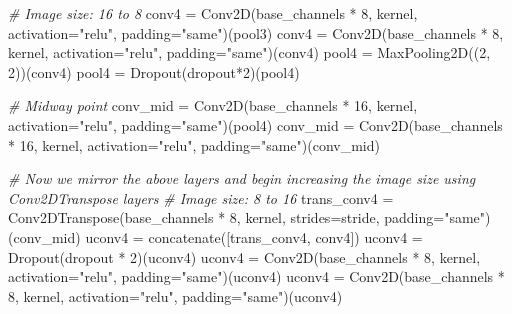 \documentclass[11pt]{article}
\newenvironment{Shaded}{}{}
\newcommand{\DecValTok}[1]{\textcolor[rgb]{0.25,0.63,0.44}{{#1}}}
\newcommand{\StringTok}[1]{\textcolor[rgb]{0.25,0.44,0.63}{{#1}}}
\newcommand{\CommentTok}[1]{\textcolor[rgb]{0.38,0.63,0.69}{\textit{{#1}}}}
\newcommand{\NormalTok}[1]{{#1}}
\newcommand{\OperatorTok}[1]{\textcolor[rgb]{0.40,0.40,0.40}{{#1}}}
\begin{document}
\begin{Shaded}
\begin{Highlighting}[]
    \CommentTok{# Image size: 16 to 8}
\NormalTok{    conv4 }\OperatorTok{=}\NormalTok{ Conv2D(base_channels }\OperatorTok{*} \DecValTok{8}\NormalTok{, kernel, activation}\OperatorTok{=}\StringTok{"relu"}\NormalTok{, padding}\OperatorTok{=}\StringTok{"same"}\NormalTok{)(pool3)}
\NormalTok{    conv4 }\OperatorTok{=}\NormalTok{ Conv2D(base_channels }\OperatorTok{*} \DecValTok{8}\NormalTok{, kernel, activation}\OperatorTok{=}\StringTok{"relu"}\NormalTok{, padding}\OperatorTok{=}\StringTok{"same"}\NormalTok{)(conv4)}
\NormalTok{    pool4 }\OperatorTok{=}\NormalTok{ MaxPooling2D((}\DecValTok{2}\NormalTok{, }\DecValTok{2}\NormalTok{))(conv4)}
\NormalTok{    pool4 }\OperatorTok{=}\NormalTok{ Dropout(dropout}\OperatorTok{*}\DecValTok{2}\NormalTok{)(pool4)}

    \CommentTok{# Midway point}
\NormalTok{    conv_mid }\OperatorTok{=}\NormalTok{ Conv2D(base_channels }\OperatorTok{*} \DecValTok{16}\NormalTok{, kernel, activation}\OperatorTok{=}\StringTok{"relu"}\NormalTok{, padding}\OperatorTok{=}\StringTok{"same"}\NormalTok{)(pool4)}
\NormalTok{    conv_mid }\OperatorTok{=}\NormalTok{ Conv2D(base_channels }\OperatorTok{*} \DecValTok{16}\NormalTok{, kernel, activation}\OperatorTok{=}\StringTok{"relu"}\NormalTok{, padding}\OperatorTok{=}\StringTok{"same"}\NormalTok{)(conv_mid)}

    \CommentTok{# Now we mirror the above layers and begin increasing the image size using Conv2DTranspose layers}
    \CommentTok{# Image size: 8 to 16}
\NormalTok{    trans_conv4 }\OperatorTok{=}\NormalTok{ Conv2DTranspose(base_channels }\OperatorTok{*} \DecValTok{8}\NormalTok{, kernel, strides}\OperatorTok{=}\NormalTok{stride, padding}\OperatorTok{=}\StringTok{"same"}\NormalTok{)(conv_mid)}
\NormalTok{    uconv4 }\OperatorTok{=}\NormalTok{ concatenate([trans_conv4, conv4])}
\NormalTok{    uconv4 }\OperatorTok{=}\NormalTok{ Dropout(dropout }\OperatorTok{*} \DecValTok{2}\NormalTok{)(uconv4)}
\NormalTok{    uconv4 }\OperatorTok{=}\NormalTok{ Conv2D(base_channels }\OperatorTok{*} \DecValTok{8}\NormalTok{, kernel, activation}\OperatorTok{=}\StringTok{"relu"}\NormalTok{, padding}\OperatorTok{=}\StringTok{"same"}\NormalTok{)(uconv4)}
\NormalTok{    uconv4 }\OperatorTok{=}\NormalTok{ Conv2D(base_channels }\OperatorTok{*} \DecValTok{8}\NormalTok{, kernel, activation}\OperatorTok{=}\StringTok{"relu"}\NormalTok{, padding}\OperatorTok{=}\StringTok{"same"}\NormalTok{)(uconv4)}


\end{Highlighting}
\end{Shaded}
\end{document}
